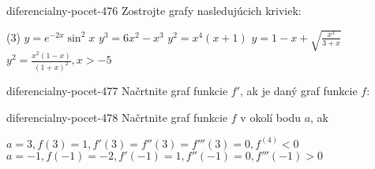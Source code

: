 \begin{defproblem}{diferencialny-pocet-476}
Zostrojte grafy nasledujúcich kriviek:
\begin{tasks}(3)
  \task $y=e^{-2x}\sin^2 x$
  \task $y^3=6x^2-x^3$
  \task $y^2=x^4(x+1)$
  \task $y=1-x+\sqrt{\frac{x^3}{3+x}}$
  \task* $y^2=\frac{x^2(1-x)}{(1+x)^2},x>-5$
\end{tasks}
\end{defproblem}

\begin{defproblem}{diferencialny-pocet-477}
Načrtnite graf funkcie $f'$, ak je daný graf funkcie $f$:
\end{defproblem}

\begin{defproblem}{diferencialny-pocet-478}
Načrtnite graf funkcie $f$ v okolí bodu $a$, ak
\begin{tasks}
\task $a=3,f(3)=1,f'(3)=f''(3)=f'''(3)=0,f^{(4)}<0$
\task $a=-1,f(-1)=-2,f'(-1)=1,f''(-1)=0,f'''(-1)>0$
\end{tasks}
\end{defproblem}